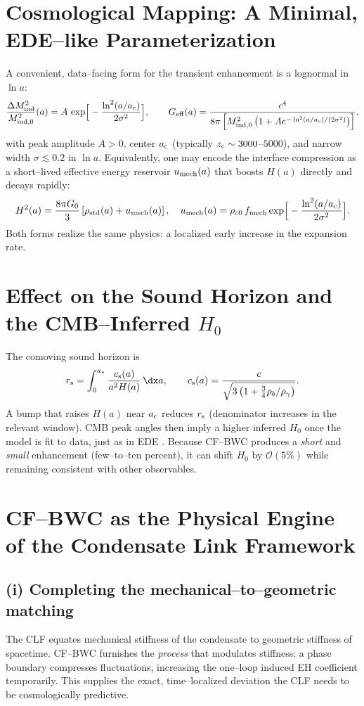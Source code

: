 \documentclass[11pt,a4paper]{article}
\newcommand{\rs}{r_{\rm s}}
\newcommand{\Geff}{G_{\rm eff}}
\newcommand{\ac}{a_{\rm c}}
\newcommand{\zc}{z_{\rm c}}
\newcommand{\cs}{c_{\rm s}}
\newcommand{\be}{\begin{equation}}
\newcommand{\ee}{\end{equation}}
\begin{document}
\section{Cosmological Mapping: A Minimal, EDE--like Parameterization}
A convenient, data--facing form for the transient enhancement is a lognormal in $\ln a$:
\be
\frac{\Delta M_{\rm ind}^2}{M_{\rm ind,0}^2}(a)=
A\,\exp\!\Big[-\frac{\ln^2(a/\ac)}{2\sigma^2}\Big], \qquad
\Geff(a)=\frac{c^4}{8\pi\left[M_{\rm ind,0}^2\left(1+A e^{-\ln^2(a/\ac)/(2\sigma^2)}\right)\right]},
\label{eq:Geffbump}
\ee
with peak amplitude $A>0$, center $\ac$ (typically $\zc\sim 3000$--$5000$), and narrow width $\sigma\lesssim 0.2$ in $\ln a$. Equivalently, one may encode the interface compression as a short--lived effective energy reservoir $u_{\rm mech}(a)$ that boosts $H(a)$ directly and decays rapidly:
\be
H^2(a) = \frac{8\pi G_0}{3}\left[\rho_{\rm std}(a)+u_{\rm mech}(a)\right], \quad
u_{\rm mech}(a)=\rho_{\rm c0}\,f_{\rm mech}
\exp\!\Big[-\frac{\ln^2(a/\ac)}{2\sigma^2}\Big].
\ee
Both forms realize the same physics: a localized early increase in the expansion rate.

\section{Effect on the Sound Horizon and the CMB--Inferred $H_0$}
The comoving sound horizon is
\be
\rs = \int_0^{a_\ast} \frac{\cs(a)}{a^2 H(a)}\,\dx a,
\qquad
\cs(a) = \frac{c}{\sqrt{3\left(1+\tfrac{3}{4}\rho_b/\rho_\gamma\right)}}.
\ee
A bump that raises $H(a)$ near $\ac$ reduces $\rs$ (denominator increases in the relevant window). CMB peak angles then imply a higher inferred $H_0$ once the model is fit to data, just as in EDE \cite{EDEReview2023,PoulinReview2023,Planck2018}. Because CF--BWC produces a \emph{short} and \emph{small} enhancement (few--to--ten percent), it can shift $H_0$ by $\mathcal{O}(5\%)$ while remaining consistent with other observables.

\section{CF--BWC as the Physical Engine of the Condensate Link Framework}
\subsection*{(i) Completing the mechanical--to--geometric matching}
The CLF equates mechanical stiffness of the condensate to geometric stiffness of spacetime. CF--BWC furnishes the \emph{process} that modulates stiffness: a phase boundary compresses fluctuations, increasing the one--loop induced EH coefficient temporarily. This supplies the exact, time--localized deviation the CLF needs to be cosmologically predictive.
\end{document}
